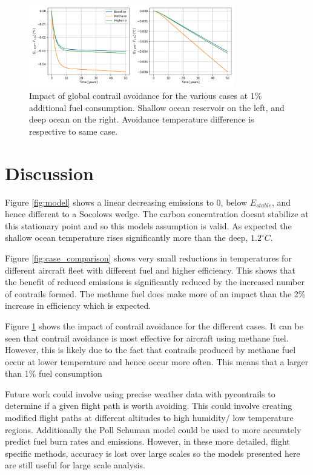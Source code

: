\documentclass{article}
\begin{document}
\begin{figure}[H]
    \centering
    \includegraphics[width=0.8\textwidth]{figures/avoidance_comparison.png}
    \caption{Impact of global contrail avoidance for the various cases at 1\% additional fuel consumption. Shallow ocean reservoir on the left, and deep ocean on the right. Avoidance temperature difference is respective to same case.}
    \label{fig:avoidance_comparison}
\end{figure}


\section{Discussion}

Figure \ref{fig:model} shows a linear decreasing emissions to 0, below $E_{stable}$, and hence different to a Socolows wedge.
The carbon concentration doesnt stabilize at this stationary point and so this models assumption is valid.
As expected the shallow ocean temperature rises significantly more than the deep, $1.2^\circ C$.

Figure \ref{fig:case_comparison} shows very small reductions in temperatures for different aircraft fleet with different fuel and higher efficiency.
This shows that the benefit of reduced emissions is significantly reduced by the increased number of contrails formed.
The methane fuel does make more of an impact than the 2\% increase in efficiency which is expected.

Figure \ref{fig:avoidance_comparison} shows the impact of contrail avoidance for the different cases.
It can be seen that contrail avoidance is most effective for aircraft using methane fuel.
However, this is likely due to the fact that contrails produced by methane fuel occur at lower temperature and hence occur more often.
This means that a larger than 1\% fuel consumption 

Future work could involve using precise weather data with pycontrails to determine if a given flight path is worth avoiding.
This could involve creating modified flight paths at different altitudes to high humidity/ low temperature regions.
Additionally the Poll Schuman model could be used to more accurately predict fuel burn rates and emissions.
However, in these more detailed, flight specific methods, accuracy is lost over large scales so the models presented here are still useful for large scale analysis.
\end{document}
